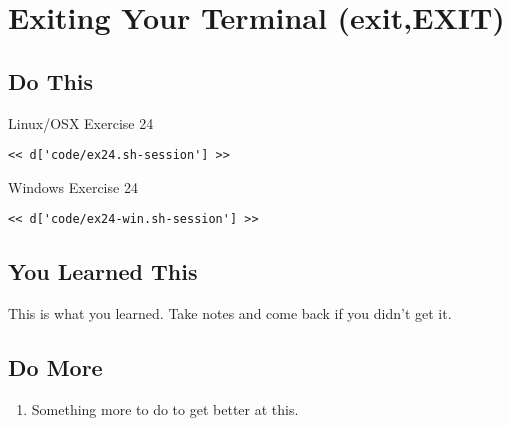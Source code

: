 \chapter{Exiting Your Terminal (exit,EXIT)}

\section{Do This}

\begin{code}{Linux/OSX Exercise 24}
\begin{Verbatim}
<< d['code/ex24.sh-session'] >>
\end{Verbatim}
\end{code}

\begin{code}{Windows Exercise 24}
\begin{Verbatim}
<< d['code/ex24-win.sh-session'] >>
\end{Verbatim}
\end{code}

\section{You Learned This}

This is what you learned.  Take notes and come back if you didn't get it.

\section{Do More}

\begin{enumerate}
\item Something more to do to get better at this.
\end{enumerate}

